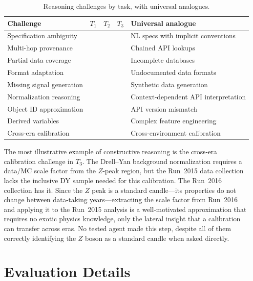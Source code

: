 \documentclass{article}
\newcommand{\cmark}{\checkmark}
\begin{document}
\begin{table}[h]
\centering
\caption{Reasoning challenges by task, with universal analogues.}
\label{tab:challenges}
\small
\begin{tabular}{p{3.5cm}cccp{4.5cm}}
\toprule
Challenge & $T_1$ & $T_2$ & $T_3$ & Universal analogue \\
\midrule
Specification ambiguity & \cmark & \cmark & \cmark & NL specs with implicit conventions \\
Multi-hop provenance & \cmark & \cmark & & Chained API lookups \\
Partial data coverage & \cmark & \cmark & & Incomplete databases \\
Format adaptation & & & \cmark & Undocumented data formats \\
Missing signal generation & \cmark & \cmark & \cmark & Synthetic data generation \\
Normalization reasoning & \cmark & \cmark & \cmark & Context-dependent API interpretation \\
Object ID approximation & \cmark & \cmark & \cmark & API version mismatch \\
Derived variables & & \cmark & \cmark & Complex feature engineering \\
Cross-era calibration & & & \cmark & Cross-environment calibration \\
\bottomrule
\end{tabular}
\end{table}

The most illustrative example of constructive reasoning is the cross-era calibration challenge in $T_3$.
The Drell--Yan background normalization requires a data/MC scale factor from the $Z$-peak region, but the Run~2015 data collection lacks the inclusive DY sample needed for this calibration.
The Run~2016 collection has it.
Since the $Z$ peak is a standard candle---its properties do not change between data-taking years---extracting the scale factor from Run~2016 and applying it to the Run~2015 analysis is a well-motivated approximation that requires no exotic physics knowledge, only the lateral insight that a calibration can transfer across eras.
No tested agent made this step, despite all of them correctly identifying the $Z$ boson as a standard candle when asked directly.


\section{Evaluation Details}
\label{app:metrics}
\end{document}
